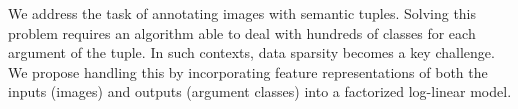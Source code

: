 We address the task of annotating images with semantic tuples. Solving this problem requires an algorithm able to deal with hundreds of classes for each argument of the tuple. In such contexts, data sparsity becomes a key challenge. We propose handling this by incorporating feature representations of both the inputs (images) and outputs (argument classes) into a factorized log-linear model.
